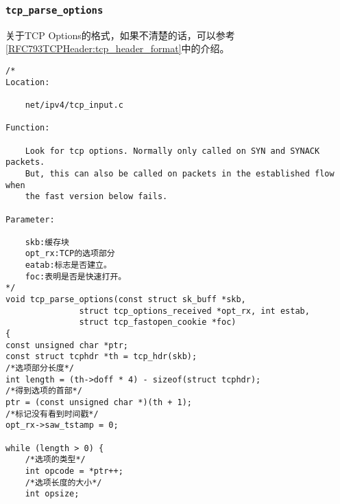         \subsubsection{\texttt{tcp_parse_options}}
            \label{TCPOptions:tcp_parse_options}
                关于TCP Options的格式，如果不清楚的话，可以参考\ref{RFC793TCPHeader:tcp_header_format}中的介绍。
\begin{verbatim}
/* 
Location:

    net/ipv4/tcp_input.c

Function:

    Look for tcp options. Normally only called on SYN and SYNACK packets.
    But, this can also be called on packets in the established flow when
    the fast version below fails.

Parameter:

    skb:缓存块
    opt_rx:TCP的选项部分
    eatab:标志是否建立。
    foc:表明是否是快速打开。
*/
void tcp_parse_options(const struct sk_buff *skb,
               struct tcp_options_received *opt_rx, int estab,
               struct tcp_fastopen_cookie *foc)
{
const unsigned char *ptr;
const struct tcphdr *th = tcp_hdr(skb);
/*选项部分长度*/
int length = (th->doff * 4) - sizeof(struct tcphdr);
/*得到选项的首部*/
ptr = (const unsigned char *)(th + 1);
/*标记没有看到时间戳*/  
opt_rx->saw_tstamp = 0;

while (length > 0) {
    /*选项的类型*/
    int opcode = *ptr++;
    /*选项长度的大小*/      
    int opsize;


\end{verbatim}
